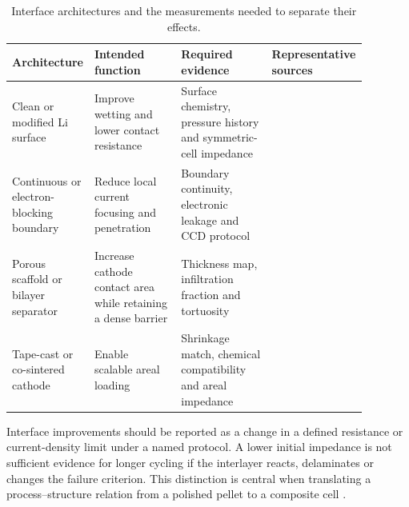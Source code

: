 \begin{table}[t]
\centering
\caption{Interface architectures and the measurements needed to separate their effects.}
\label{tab:interfaces}
\begin{tabular}{P{0.22\linewidth}P{0.25\linewidth}P{0.26\linewidth}P{0.15\linewidth}}
\toprule
Architecture & Intended function & Required evidence & Representative sources \\
\midrule
Clean or modified Li surface & Improve wetting and lower contact resistance & Surface chemistry, pressure history and symmetric-cell impedance & \cite{cui2022melt,cai2022in,du2021smart} \\
Continuous or electron-blocking boundary & Reduce local current focusing and penetration & Boundary continuity, electronic leakage and CCD protocol & \cite{du2024constructing,zhang2024an,klimpel2023standardizing} \\
Porous scaffold or bilayer separator & Increase cathode contact area while retaining a dense barrier & Thickness map, infiltration fraction and tortuosity & \cite{zhang2023bilayer,go2026developing,zubair2026high} \\
Tape-cast or co-sintered cathode & Enable scalable areal loading & Shrinkage match, chemical compatibility and areal impedance & \cite{touidjine2026tape,roitzheim2026fully,touidjine2024the} \\
\bottomrule
\end{tabular}
\end{table}

Interface improvements should be reported as a change in a defined resistance or current-density limit under a named protocol. A lower initial impedance is not sufficient evidence for longer cycling if the interlayer reacts, delaminates or changes the failure criterion. This distinction is central when translating a process--structure relation from a polished pellet to a composite cell \cite{wang2024accelerating,yu2024elucidating,wang2024review}.
